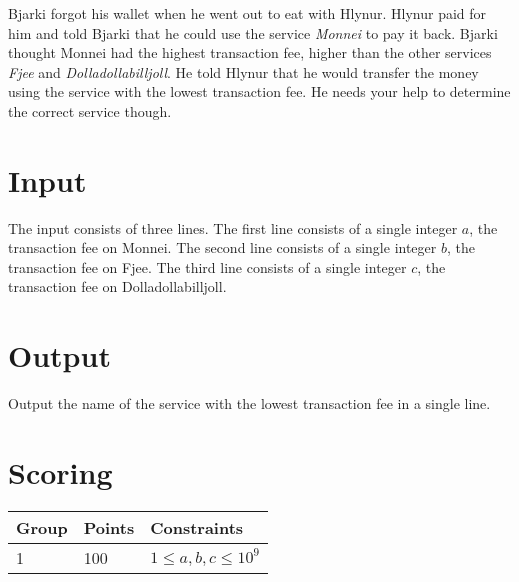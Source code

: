 
Bjarki forgot his wallet when he went out to eat with Hlynur.
Hlynur paid for him and told Bjarki that he could use the service \emph{Monnei} to pay it back.
Bjarki thought Monnei had the highest transaction fee, higher than the other services \emph{Fjee} and \emph{Dolladollabilljoll}.
He told Hlynur that he would transfer the money using the service with the lowest transaction fee.
He needs your help to determine the correct service though.

\section*{Input}
The input consists of three lines.
The first line consists of a single integer $a$, the transaction fee on Monnei.
The second line consists of a single integer $b$, the transaction fee on Fjee.
The third line consists of a single integer $c$, the transaction fee on Dolladollabilljoll.

\section*{Output}
Output the name of the service with the lowest transaction fee in a single line.

\section*{Scoring}
\begin{tabular}{|l|l|l|}
\hline
Group & Points & Constraints \\ \hline
1     & 100    & $1 \leq a, b, c \leq 10^9$ \\ \hline
\end{tabular}
